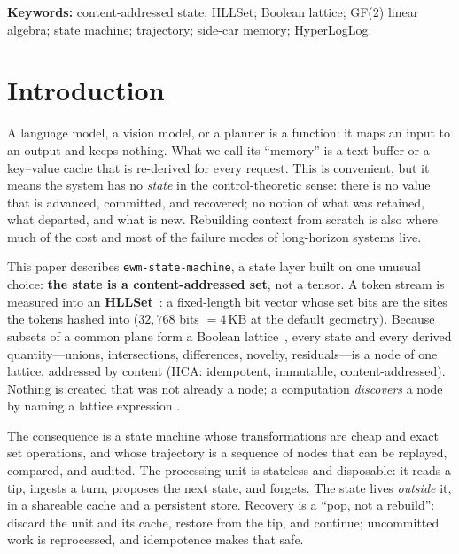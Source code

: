 \documentclass[11pt,a4paper]{article}
\theoremstyle{remark}
\begin{document}
\noindent\textbf{Keywords:} content-addressed state; HLLSet; Boolean lattice;
GF(2) linear algebra; state machine; trajectory; side-car memory; HyperLogLog.

\section{Introduction}
\label{sec:intro}

A language model, a vision model, or a planner is a function: it maps an input
to an output and keeps nothing. What we call its ``memory'' is a text buffer or
a key--value cache that is re-derived for every request. This is convenient, but
it means the system has no \emph{state} in the control-theoretic sense: there is
no value that is advanced, committed, and recovered; no notion of what was
retained, what departed, and what is new. Rebuilding context from scratch is
also where much of the cost and most of the failure modes of long-horizon
systems live.

This paper describes \texttt{ewm-state-machine}, a state layer built on one
unusual choice: \textbf{the state is a content-addressed set}, not a tensor. A
token stream is measured into an \textbf{HLLSet}~\cite{astesj2026,companion2026}:
a fixed-length bit vector whose set bits are the sites the tokens hashed into
($32{,}768$ bits $= 4$\,KB at the default geometry). Because subsets of a common
plane form a Boolean lattice~\cite{birkhoff1940}, every state and every
derived quantity---unions, intersections, differences, novelty, residuals---is
a node of one lattice, addressed by content (IICA: idempotent, immutable,
content-addressed). Nothing is created that was not already a node; a
computation \emph{discovers} a node by naming a lattice expression
\cite{companion2026}.

The consequence is a state machine whose transformations are cheap and exact set
operations, and whose trajectory is a sequence of nodes that can be replayed,
compared, and audited. The processing unit is stateless and disposable: it reads
a tip, ingests a turn, proposes the next state, and forgets. The state lives
\emph{outside} it, in a shareable cache and a persistent store. Recovery is a
``pop, not a rebuild'': discard the unit and its cache, restore from the tip, and
continue; uncommitted work is reprocessed, and idempotence makes that safe.
\end{document}

